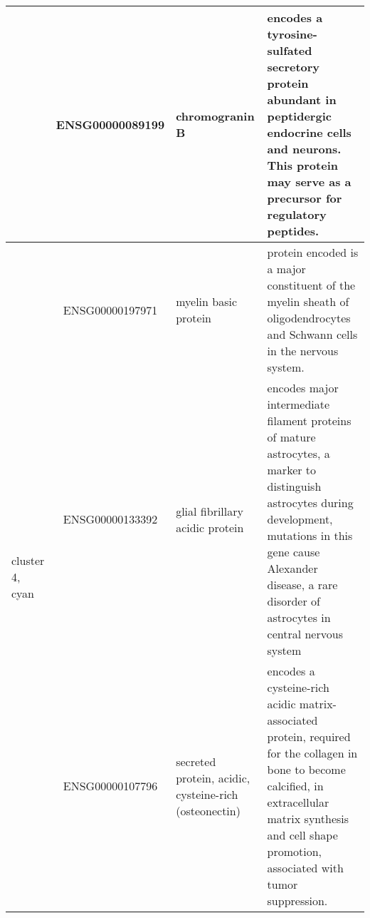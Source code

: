 \begin{table}
\begin{center}
\begin{tabular}{|p{0.5in}|c|p{1in}|p{3.5in}|}
					    &  ENSG00000089199 &  chromogranin B & encodes a tyrosine-sulfated secretory protein abundant in peptidergic endocrine cells and neurons. This protein may serve as a precursor for regulatory peptides. \\
 \hline
 \multirow{3}{4em}{cluster 4, cyan} & ENSG00000197971 & myelin basic protein & protein encoded is a major constituent of the myelin sheath of oligodendrocytes and Schwann cells in the nervous system. \\
 					    & ENSG00000133392 & glial fibrillary acidic protein & encodes major intermediate filament proteins of mature astrocytes, a marker to distinguish astrocytes during development, mutations in this gene cause Alexander disease, a rare disorder of astrocytes in central nervous system\\
					    & ENSG00000107796  & secreted protein, acidic, cysteine-rich (osteonectin)  & encodes a cysteine-rich acidic matrix-associated protein, required for the collagen in bone to become calcified, in extracellular matrix synthesis and cell shape promotion, associated with tumor suppression. \\
\hline
\end{tabular}
 \end{center} \label{tab:tab2}
\end{table}



